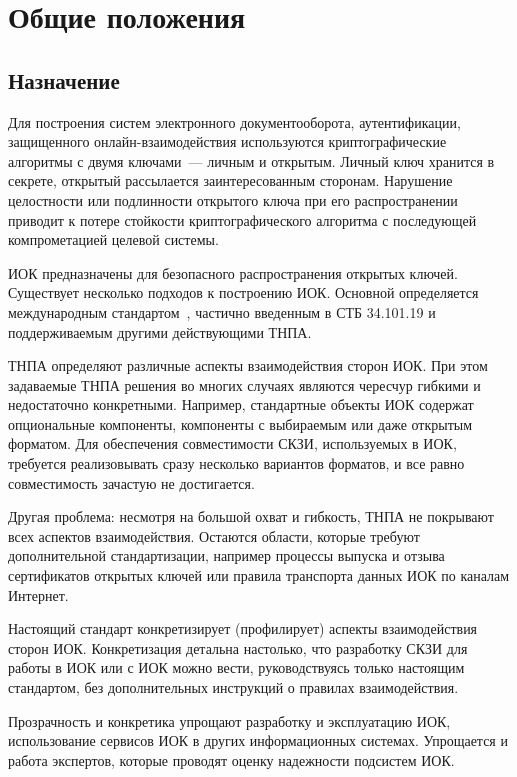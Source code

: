 \chapter{Общие положения}\label{COMMON}

\section{Назначение}

Для построения систем электронного документооборота, 
аутентификации, защищенного онлайн-взаимодействия
используются криптографические алгоритмы с двумя ключами~---
личным и открытым. Личный ключ хранится в секрете, открытый 
рассылается заинтересованным сторонам. Нарушение целостности или подлинности 
открытого ключа при его распространении приводит к потере стойкости 
криптографического алгоритма с последующей компрометацией целевой системы.

ИОК предназначены для безопасного распространения открытых ключей.
Существует несколько подходов к построению ИОК. Основной 
определяется международным стандартом~\cite{X509}, частично введенным в СТБ 
34.101.19 и поддерживаемым другими действующими ТНПА.  

ТНПА определяют различные аспекты взаимодействия сторон ИОК.
При этом задаваемые ТНПА решения во многих случаях являются чересчур 
гибкими и недостаточно конкретными. Например, стандартные объекты ИОК
содержат опциональные компоненты, компоненты с выбираемым или даже 
открытым форматом. Для обеспечения совместимости СКЗИ, используемых в ИОК, 
требуется реализовывать сразу несколько вариантов форматов,
и все равно совместимость зачастую не достигается. 

Другая проблема: несмотря на большой охват и гибкость, ТНПА
не покрывают всех аспектов взаимодействия. Остаются области, 
которые требуют дополнительной стандартизации, например процессы 
выпуска и отзыва сертификатов открытых ключей или правила транспорта данных 
ИОК по каналам Интернет. 

Настоящий стандарт конкретизирует (профилирует) аспекты взаимодействия 
сторон ИОК. Конкретизация детальна настолько, что разработку СКЗИ 
для работы в ИОК или с ИОК можно вести, руководствуясь только 
настоящим стандартом, без дополнительных инструкций о правилах 
взаимодействия.

Прозрачность и конкретика упрощают разработку и эксплуатацию ИОК,
использование сервисов ИОК в других информационных системах.
Упрощается и работа экспертов, которые проводят оценку надежности подсистем ИОК.

